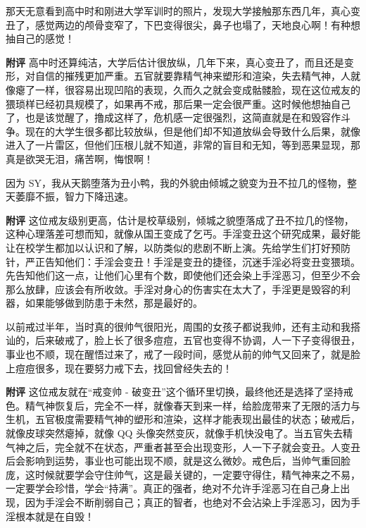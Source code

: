 \begin{case}[变丑]
    那天无意看到高中时和刚进大学军训时的照片，发现大学接触那东西几年，真心变丑了，感觉两边的颅骨变窄了，下巴变得很尖，鼻子也塌了，天地良心啊！有种想抽自己的感觉！

    \textbf{附评} 高中时还算纯洁，大学后估计很放纵，几年下来，真心变丑了，而且还是变形，对自信的摧残更加严重。五官就要靠精气神来塑形和渲染，失去精气神，人就像瘪了一样，很容易出现凹陷的表现，久而久之就会变成骷髅脸，现在这位戒友的猥琐样已经初具规模了，如果再不戒，那后果一定会很严重。这时候他想抽自己了，也是该觉醒了，撸成这样了，危机感一定很强烈，这简直就是在和毁容作斗争。现在的大学生很多都比较放纵，但是他们却不知道放纵会导致什么后果，就像进入了一片雷区，但他们压根儿就不知道，非常的盲目和无知，等到恶果显现，那真是欲哭无泪，痛苦啊，悔恨啊！
\end{case}

\begin{case}[变丑]
    因为 SY，我从天鹅堕落为丑小鸭，我的外貌由倾城之貌变为丑不拉几的怪物，整天萎靡不振，智力下降迅速。

    \textbf{附评} 这位戒友级别更高，估计是校草级别，倾城之貌堕落成了丑不拉几的怪物，这种心理落差可想而知，就像从国王变成了乞丐。手淫变丑这个研究成果，最好能让在校学生都加以认识和了解，以防类似的悲剧不断上演。先给学生们打好预防针，严正告知他们：手淫会变丑！手淫是变丑的捷径，沉迷手淫必将变丑变猥琐。先告知他们这一点，让他们心里有个数，即使他们还会染上手淫恶习，但至少不会那么放肆，应该会有所收敛。手淫对身心的伤害实在太大了，手淫更是毁容的利器，如果能够做到防患于未然，那是最好的。
\end{case}

\begin{case}[变丑]
    以前戒过半年，当时真的很帅气很阳光，周围的女孩子都说我帅，还有主动和我搭讪的，后来破戒了，脸上长了很多痘痘，五官也变得不协调，人一下子变得很丑，事业也不顺，现在醒悟过来了，戒了一段时间，感觉从前的帅气又回来了，就是脸上痘痘很多，现在要努力戒下去，找回曾经失去的！

    \textbf{附评} 这位戒友就在“戒变帅 - 破变丑”这个循环里切换，最终他还是选择了坚持戒色。精气神恢复后，完全不一样，就像春天到来一样，给脸庞带来了无限的活力与生机，五官极度需要精气神的塑形和渲染，这样才能表现出最佳的状态；破戒后，就像皮球突然瘪掉，就像 QQ 头像突然变灰，就像手机快没电了。当五官失去精气神之后，完全就不在状态，严重者甚至会出现变形，人一下子就会变丑。人变丑后会影响到运势，事业也可能出现不顺，就是这么微妙。戒色后，当帅气重回脸庞，这时候就要学会守住帅气，这是最关键的，一定要守得住，精气神来之不易，一定要学会珍惜，学会“持满”。真正的强者，绝对不允许手淫恶习在自己身上出现，因为手淫会不断削弱自己；真正的智者，也绝对不会沾染上手淫恶习，因为手淫根本就是在自毁！
\end{case}

